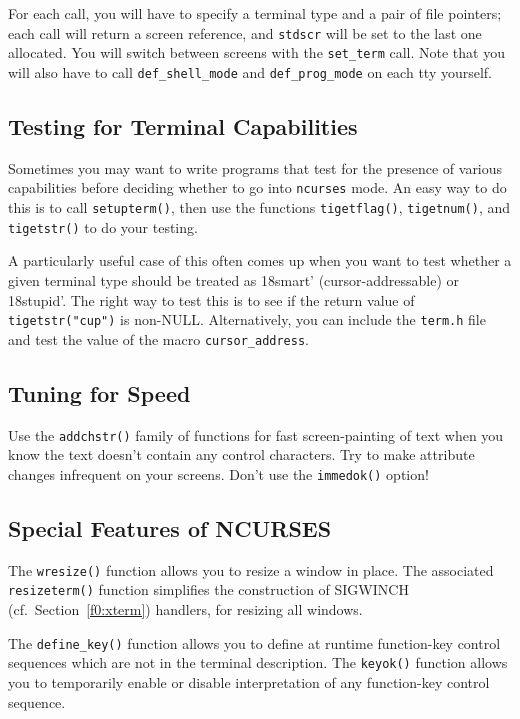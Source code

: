For each call, you will have to specify a terminal type and a pair of file
pointers; each call will return a screen reference, and \texttt{stdscr} will be
set to the last one allocated.  You will switch between screens with the
\texttt{set\_term} call.  Note that you will also have to call
\texttt{def\_shell\_mode} and \texttt{def\_prog\_mode} on each tty yourself.

\subsection{Testing for Terminal Capabilities}

\label{f0:testing}Sometimes you may want to write programs that test for the presence of various
capabilities before deciding whether to go into \texttt{ncurses} mode.  An easy
way to do this is to call \texttt{setupterm()}, then use the functions
\texttt{tigetflag()}, \texttt{tigetnum()}, and \texttt{tigetstr()} to do your
testing. 

A particularly useful case of this often comes up when you want to
test whether a given terminal type should be treated as \char18smart'
(cursor-addressable) or \char18stupid'.  The right way to test this is to see
if the return value of \texttt{tigetstr({\tt{}"{}}cup{\tt{}"{}})} is non-NULL.  Alternatively,
you can include the \texttt{term.h} file and test the value of the
macro \texttt{cursor\_address}.

\subsection{Tuning for Speed}

\label{f0:tuning}Use the \texttt{addchstr()} family of functions for fast
screen-painting of text when you know the text doesn't contain any
control characters.  Try to make attribute changes infrequent on your
screens.  Don't use the \texttt{immedok()} option!

\subsection{Special Features of NCURSES}

\label{f0:special}The \texttt{wresize()} function allows you to resize a window in place.
The associated \texttt{resizeterm()} function simplifies the construction
of SIGWINCH (cf.\ Section~\ref{f0:xterm}) handlers, for resizing all windows.  

The \texttt{define\_key()} function allows you
to define at runtime function-key control sequences which are not in the
terminal description.
The \texttt{keyok()} function allows you to temporarily
enable or disable interpretation of any function-key control sequence. 

